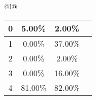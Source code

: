 \begin{longtable}{@{}l@{}}
\begin{minipage}{\textwidth}
\begin{tabular}{|c|c|c|c|}
0 & 5.00\% & 2.00\% & \textcolor{red}{\ding{55}} \\ \hline
1 & 0.00\% & 37.00\% & \textcolor{green}{\ding{51}} \\ \hline
2 & 0.00\% & 2.00\% & \textcolor{green}{\ding{51}} \\ \hline
3 & 0.00\% & 16.00\% & \textcolor{green}{\ding{51}} \\ \hline
4 & 81.00\% & 82.00\% & \textcolor{green}{\ding{51}} \\ \hline
\end{tabular}
\end{minipage}\\[2ex]
\end{longtable}